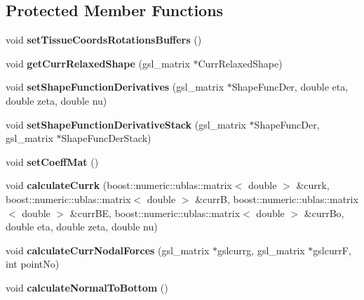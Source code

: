 \subsection*{Protected Member Functions}
\begin{DoxyCompactItemize}
\item 
\hypertarget{classPrism_a39d403ac6ffb6b56d5b2d07f8e9463a4}{}void {\bfseries set\+Tissue\+Coords\+Rotations\+Buffers} ()\label{classPrism_a39d403ac6ffb6b56d5b2d07f8e9463a4}

\item 
\hypertarget{classPrism_a3c252dc104a1ca7208b23c72737cd916}{}void {\bfseries get\+Curr\+Relaxed\+Shape} (gsl\+\_\+matrix $\ast$Curr\+Relaxed\+Shape)\label{classPrism_a3c252dc104a1ca7208b23c72737cd916}

\item 
\hypertarget{classPrism_aa1a4d3411d1f3dc05816ec01dcfa8310}{}void {\bfseries set\+Shape\+Function\+Derivatives} (gsl\+\_\+matrix $\ast$Shape\+Func\+Der, double eta, double zeta, double nu)\label{classPrism_aa1a4d3411d1f3dc05816ec01dcfa8310}

\item 
\hypertarget{classPrism_aa1f76f3cabdd00eb057f41cebbaa466d}{}void {\bfseries set\+Shape\+Function\+Derivative\+Stack} (gsl\+\_\+matrix $\ast$Shape\+Func\+Der, gsl\+\_\+matrix $\ast$Shape\+Func\+Der\+Stack)\label{classPrism_aa1f76f3cabdd00eb057f41cebbaa466d}

\item 
\hypertarget{classPrism_a0575442613f8b7d9428c58cef19ab219}{}void {\bfseries set\+Coeff\+Mat} ()\label{classPrism_a0575442613f8b7d9428c58cef19ab219}

\item 
\hypertarget{classPrism_aa433244f86cdf23a611a1adc3391c3f0}{}void {\bfseries calculate\+Currk} (boost\+::numeric\+::ublas\+::matrix$<$ double $>$ \&currk, boost\+::numeric\+::ublas\+::matrix$<$ double $>$ \&curr\+B, boost\+::numeric\+::ublas\+::matrix$<$ double $>$ \&curr\+B\+E, boost\+::numeric\+::ublas\+::matrix$<$ double $>$ \&curr\+Bo, double eta, double zeta, double nu)\label{classPrism_aa433244f86cdf23a611a1adc3391c3f0}

\item 
\hypertarget{classPrism_aea47379b3064d866f93508a9337d8f12}{}void {\bfseries calculate\+Curr\+Nodal\+Forces} (gsl\+\_\+matrix $\ast$gslcurrg, gsl\+\_\+matrix $\ast$gslcurr\+F, int point\+No)\label{classPrism_aea47379b3064d866f93508a9337d8f12}

\item 
\hypertarget{classPrism_a872ce1e6304b1400d2d0e712af2a0131}{}void {\bfseries calculate\+Normal\+To\+Bottom} ()\label{classPrism_a872ce1e6304b1400d2d0e712af2a0131}


\end{DoxyCompactItemize}
